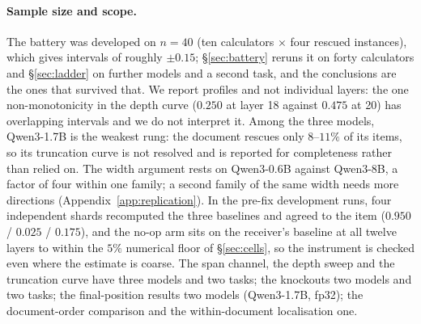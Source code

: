 \documentclass{article}
\begin{document}
\paragraph{Sample size and scope.} The battery was developed on $n=40$ (ten
calculators $\times$ four rescued instances), which gives intervals of roughly
$\pm 0.15$; \S\ref{sec:battery} reruns it on forty calculators and
\S\ref{sec:ladder} on further models and a second task, and the conclusions are
the ones that survived that. We report profiles and not individual layers: the one
non-monotonicity in the depth curve ($0.250$ at layer 18 against $0.475$ at 20)
has overlapping intervals and we do not interpret it. Among the three models,
Qwen3-1.7B is the weakest rung: the document rescues only $8$--$11\%$ of its
items, so its truncation curve is not resolved and is reported for completeness
rather than relied on. The width argument rests on Qwen3-0.6B against Qwen3-8B,
a factor of four within one family; a second family of the same width needs
more directions (Appendix~\ref{app:replication}).
In the pre-fix development runs, four independent shards recomputed the three baselines and agreed to the item
($0.950$ / $0.025$ / $0.175$), and the no-op arm sits on the receiver's baseline
at all twelve layers to within the $5\%$ numerical floor of
\S\ref{sec:cells}, so the instrument is checked even where the estimate is
coarse. The span channel, the depth sweep and the truncation curve have three
models and two tasks; the knockouts two models and two tasks; the final-position
results two models (Qwen3-1.7B, fp32); the document-order comparison and the
within-document localisation one.
\end{document}
